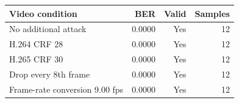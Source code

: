 \begin{tabular}{lrrr}
\toprule
Video condition & BER & Valid & Samples \\
\midrule
No additional attack & 0.0000 & Yes & 12 \\
H.264 CRF 28 & 0.0000 & Yes & 12 \\
H.265 CRF 30 & 0.0000 & Yes & 12 \\
Drop every 8th frame & 0.0000 & Yes & 12 \\
Frame-rate conversion 9.00 fps & 0.0000 & Yes & 12 \\
\bottomrule
\end{tabular}
